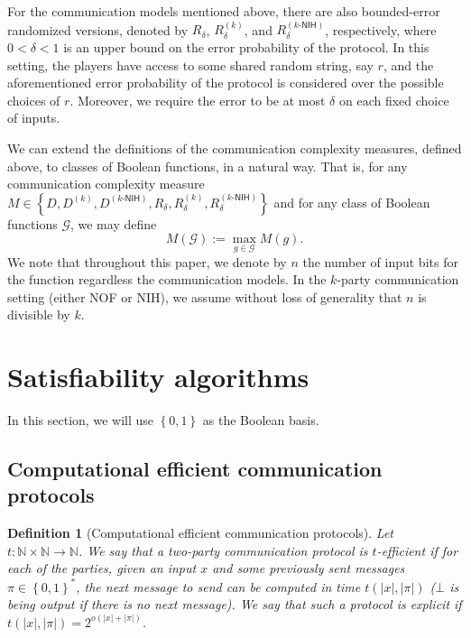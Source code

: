 \documentclass[10pt,a4paper]{article}
\newtheorem{definition}[theorem]{Definition}
\newcommand{\bool}{\left\{0,1\right\}}
\newcommand{\naturals}{\mathbb{N}}
\newcommand{\cprn}[1]{\!\left(#1\right)}
\newcommand{\brkts}[1]{\left\{#1\right\}}
\begin{document}
    For the communication models mentioned above, there are also bounded-error randomized versions, denoted by $R_\delta$, $R_\delta^{(k)}$, and $R^{(k\text{-}\mathsf{NIH})}_\delta$, respectively, where $0<\delta<1$ is an upper bound on the error probability of the protocol. In this setting, the players have access to some shared random string, say $r$, and the aforementioned error probability of the protocol is considered over the possible choices of $r$. Moreover, we require the error to be at most $\delta$ on each fixed choice of inputs.
    
    We can extend the definitions of the communication complexity measures, defined above, to classes of Boolean functions, in a natural way. That is, for any communication complexity measure $M\in\brkts{D,D^{(k)},D^{(k\text{-}\mathsf{NIH})},R_\delta,R_\delta^{(k)},R_\delta^{(k\text{-}\mathsf{NIH})}}$ and for any class of Boolean functions $\mathcal{G}$, we may define
    \[
        M\cprn{\mathcal{G}}:=\max_{g\in\mathcal{G}}M\cprn{g}.
    \]
	We note that throughout this paper, we denote by $n$ the number of input bits for the function regardless the communication models. In the $k$-party communication setting (either NOF or NIH), we assume without loss of generality that $n$ is divisible by $k$.
	

\setcounter{section}{4}
\setcounter{theorem}{39}
    \section{Satisfiability algorithms}\label{sec:sat}
	
	In this section, we will use $\bool$ as the Boolean basis.
	
	\subsection{Computational efficient communication protocols}
	
	\begin{definition}[Computational efficient communication protocols]
	    Let $t\colon\naturals\times\naturals\to\naturals$. We say that a two-party communication protocol is \emph{$t$-efficient} if for each of the parties, given an input $x$ and some previously sent messages $\pi\in\bool^{*}$, the next message to send can be computed in time $t(|x|,|\pi|)$ ($\bot$ is being output if there is no next message). We say that such a protocol is \emph{explicit} if $t(|x|,|\pi|)=2^{o(|x|+|\pi|)}$.
	\end{definition}
\end{document}
